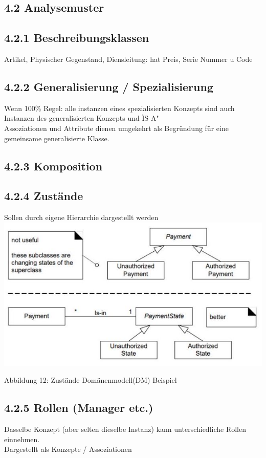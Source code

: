 \subsection*{4.2 Analysemuster}
\subsection*{4.2.1 Beschreibungsklassen}
Artikel, Physischer Gegenstand, Diensleitung: hat Preis, Serie Nummer u Code

\subsection*{4.2.2 Generalisierung / Spezialisierung}
Wenn 100\% Regel: alle instanzen eines spezialisierten Konzepts sind auch Instanzen des generalisierten Konzepts und ÏS A"\\
Assoziationen und Attribute dienen umgekehrt als Begründung für eine gemeinsame generalisierte Klasse.

\subsection*{4.2.3 Komposition}
\subsection*{4.2.4 Zustände}
Sollen durch eigene Hierarchie dargestellt werden\\
\includegraphics[width=\linewidth]{images/2024_12_29_0d1d7b5551ea1b4b41bdg-07(1)}

Abbildung 12: Zustände Domänenmodell(DM) Beispiel

\subsection*{4.2.5 Rollen (Manager etc.)}
Dasselbe Konzept (aber selten dieselbe Instanz) kann unterschiedliche Rollen einnehmen.\\
Dargestellt als Konzepte / Assoziationen

